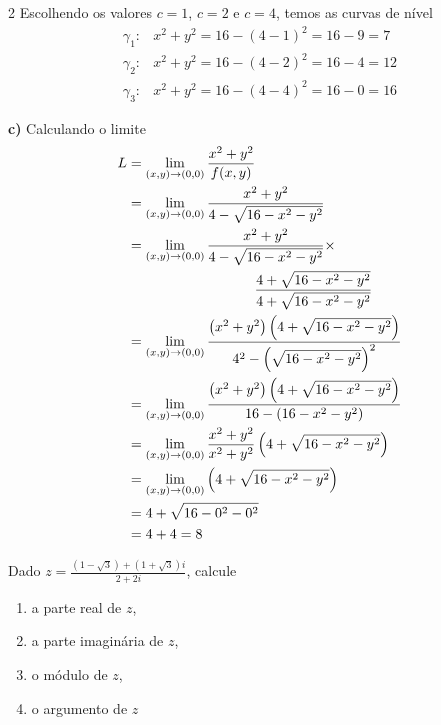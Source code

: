 \documentclass[a4paper,12pt,fleqn]{article}
\begin{document}
\begin{answer}
\begin{multicols}{2}
    Escolhendo os valores $c=1$, $c=2$ e $c=4$, temos as curvas de nível
    \begin{align*}
      \gamma_1\colon & x^2 + y^2 = 16 - (4 - 1)^2 = 16 - 9 = 7  \\
      \gamma_2\colon & x^2 + y^2 = 16 - (4 - 2)^2 = 16 - 4 = 12 \\
      \gamma_3\colon & x^2 + y^2 = 16 - (4 - 4)^2 = 16 - 0 = 16
    \end{align*}

    \vspace{\baselineskip}
    \textbf{c)\;}
    Calculando o limite
    \setlength{\jot}{12pt}
    \setlength{\mathindent}{0cm}
    \begin{align*}
      L
      & = \lim_{(x, y)\to(0, 0)} \frac{x^2+y^2}{f(x, y)} \\
      & = \lim_{(x, y)\to(0, 0)} \frac{x^2+y^2}{4 - \sqrt{16-x^2-y^2}} \\
      & = \lim_{(x, y)\to(0, 0)} \frac{x^2+y^2}{4 - \sqrt{16-x^2-y^2}} \times \\
      & \hspace{32mm}            \frac{4 + \sqrt{16-x^2-y^2}}{4 + \sqrt{16-x^2-y^2}} \\
      & = \lim_{(x, y)\to(0, 0)} \frac{\left(x^2+y^2\right)\left(4 + \sqrt{16-x^2-y^2}\right)}
                                      {4^2 - \left(\sqrt{16-x^2-y^2}\right)^2} \\
      & = \lim_{(x, y)\to(0, 0)} \frac{\left(x^2+y^2\right)\left(4 + \sqrt{16-x^2-y^2}\right)}
                                      {16 - (16-x^2-y^2)} \\
      & = \lim_{(x, y)\to(0, 0)} \frac{x^2+y^2}{x^2+y^2}\left(4 + \sqrt{16-x^2-y^2}\right) \\
      & = \lim_{(x, y)\to(0, 0)} \left(4 + \sqrt{16-x^2-y^2}\right) \\
      & = 4 + \sqrt{16-0^2-0^2} \\
      & = 4 + 4 = 8
    \end{align*}
  \end{multicols}
\end{answer}

Dado \(z=\frac{ \left(1-\sqrt{3}\right) + \left(1+\sqrt{3}\right)i}{2+2i} \), calcule
\begin{enumerate}[label=\alph*),itemsep=0pt]
  \item a parte real de $z$,
  \item a parte imaginária de $z$,
  \item o módulo de $z$,
  \item o argumento de $z$
\end{enumerate}
\clearpagequestiononly
\end{document}
